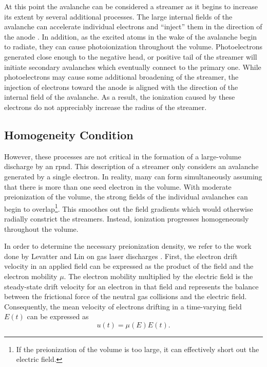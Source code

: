 At this point the avalanche can be considered a streamer as it begins to
increase its extent by several additional processes. The large internal fields
of the avalanche can accelerate individual electrons and ``inject'' them in the
direction of the anode \cite{Kunhardt1980}. In addition, as the excited atoms in
the wake of the avalanche begin to radiate, they can cause photoionization
throughout the volume. Photoelectrons generated close enough to the negative
head, or positive tail of the streamer will initiate secondary avalanches which
eventually connect to the primary one. While photoelectrons may cause some
additional broadening of the streamer, the injection of electrons toward the
anode is aligned with the direction of the internal field of the avalanche. As a
result, the ionization caused by these electrons do not appreciably increase the
radius of the streamer.

\subsection{Homogeneity Condition}

However, these processes are not critical in the formation of a large-volume
discharge by an \acs{rpnd}. This description of a streamer only considers an
avalanche generated by a single electron. In reality, many can form
simultaneously assuming that there is more than one seed electron in the volume.
With moderate preionization of the volume, the strong fields of the individual
avalanches can begin to overlap\footnote{If the preionization of the volume is
too large, it can effectively short out the electric field.}. This smoothes out
the field gradients which would otherwise radially constrict the streamers.
Instead, ionization progresses homogeneously throughout the volume.

In order to determine the necessary preionization density, we refer to the work
done by Levatter and Lin on gas laser discharges \cite{Levatter1980}. First, the
electron drift velocity in an applied field can be expressed as the product of
the field and the electron mobility $\mu$. The electron mobility multiplied by
the electric field is the steady-state drift velocity for an electron in that
field and represents the balance between the frictional force of the neutral gas
collisions and the electric field. Consequently, the mean velocity of electrons
drifting in a time-varying field $E(t)$ can be expressed as
\begin{equation}
  u(t) = \mu(E) E(t).
\end{equation}

